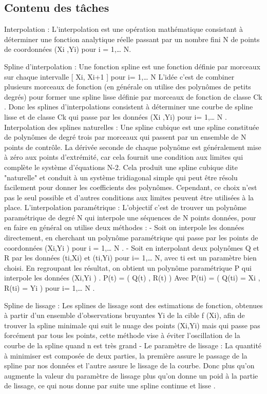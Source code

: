 \documentclass[a4paper,10pt]{article} %
\begin{document}
	\subsection{Contenu des tâches}
Interpolation :
            L’interpolation est une opération mathématique consistant à déterminer une fonction analytique réelle passant par un nombre fini N de points de coordonnées  (Xi ,Yi)  pour              i = 1,… N.
 
Spline d’interpolation :
            Une fonction spline est une fonction  définie par morceaux sur chaque intervalle          [ Xi, Xi+1 ]  pour  i= 1,… N
            L’idée c’est de combiner plusieurs morceaux de fonction (en générale on utilise des polynômes de petits degrés) pour former une spline lisse définie par morceaux de fonction de classe Ck . Donc les splines d’interpolations consistent à déterminer une courbe de spline lisse et de classe Ck qui passe par les données (Xi ,Yi)  pour  i= 1,… N .
Interpolation des splines naturelles :
            Une spline cubique est une spline constituée de polynômes de degré trois par morceaux qui passent par un ensemble de N points de contrôle. La dérivée seconde de chaque polynôme est généralement mise à zéro aux points d'extrémité, car cela fournit une condition aux limites qui complète le système d'équations N-2. Cela produit une spline cubique dite "naturelle" et conduit à un système tridiagonal simple qui peut être résolu facilement pour donner les coefficients des polynômes. Cependant, ce choix n'est pas le seul possible et d'autres conditions aux limites peuvent être utilisées à la place.
L’interpolation paramétrique :
             L'objectif  c’est de trouver un polynôme paramétrique de degré N qui interpole une séquences de N points données,  pour en faire en général on utilise deux méthodes :
-          Soit on interpole les données directement,  en cherchant un polynôme paramétrique qui passe par les points de coordonnées (Xi,Yi )   pour   i =  1,… N .
-          Soit en interpolant deux polynômes Q et R par les données (ti,Xi) et (ti,Yi) pour i= 1,… N, avec ti est un paramètre bien choisi. En regroupant les résultat, on obtient un polynôme paramétrique P qui interpole les données (Xi,Yi ) .
                P(t) = ( Q(t) , R(t) )
                         Avec      P(ti) = ( Q(ti) = Xi , R(ti) = Yi )     pour  i= 1,… N .
 
Spline de lissage :
            Les splines de lissage sont des estimations de fonction, obtenues à partir d'un ensemble d'observations bruyantes Yi de la cible f (Xi), afin de trouver la spline minimale qui suit le nuage des points (Xi,Yi) mais qui passe pas forcément par tous les points, cette méthode vise à éviter l’oscillation de la courbe de la spline quand n est très grand   
-          Le paramètre de lissage  :
            La quantité à minimiser est composée de deux parties, la première assure le passage de la spline par nos données  et l’autre assure le lissage  de la courbe. Donc plus qu’on augmente la valeur du paramètre de lissage plus qu’on donne un poid à la partie de lissage, ce qui nous donne par suite une spline continue et lisse .
 
\end{document}
